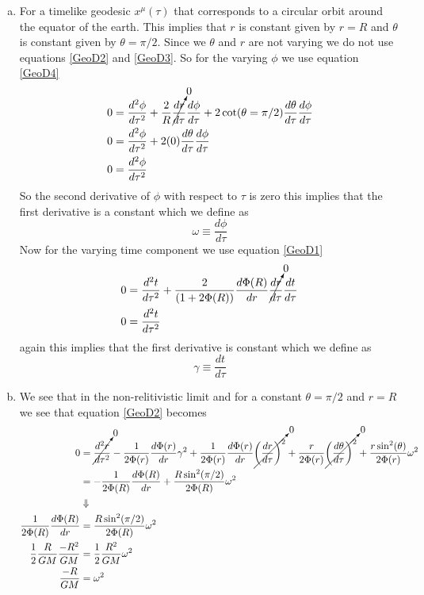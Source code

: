 \documentclass[11pt]{article}
\numberwithin{equation}{section}
\begin{document}
\begin{enumerate}[(a)]
\item
For a timelike geodesic $x^{\mu}(\tau)$ that corresponds to a circular orbit around the equator of the earth. This implies that $r$ is constant given by $r=R$ and $\theta$ is constant given by $\theta=\pi/2$. Since we $\theta$ and $r$ are not varying we do not use equations \ref{GeoD2} and \ref{GeoD3}. So for the varying $\phi$ we use equation \ref{GeoD4}
\begin{align*}
0 &= \frac{d^2\phi}{d\tau^2} + \frac{2}{R}\cancelto{0}{\frac{dr}{d\tau}}\frac{d\phi}{d\tau} + 2\cot(\theta=\pi/2)\frac{d\theta}{d\tau}\frac{d\phi}{d\tau}   \\
0 &= \frac{d^2\phi}{d\tau^2} + 2(0)\frac{d\theta}{d\tau}\frac{d\phi}{d\tau}   \\
0 &= \frac{d^2\phi}{d\tau^2}
\end{align*}
So the second derivative of $\phi$ with respect to $\tau$ is zero this implies that the first derivative is a constant which we define as
$$\omega \equiv \frac{d\phi}{d\tau}$$
Now for the varying time component we use equation \ref{GeoD1}
\begin{align*}
0 &= \frac{d^2t}{d\tau^2} + \frac{2}{(1+2\Phi(R))}\frac{d\Phi(R)}{dr}\cancelto{0}{\frac{dr}{d\tau}}\frac{dt}{d\tau}  \\
0 &= \frac{d^2t}{d\tau^2} 
\end{align*}
again this implies that the first derivative is constant which we define as
$$\gamma\equiv \frac{dt}{d\tau}$$

\item
We see that in the non-relitivistic limit and for a constant $\theta=\pi/2$ and $r=R$ we see that equation \ref{GeoD2} becomes
\begin{align*}
0 &= \cancelto{0}{\frac{d^2r}{d\tau^2}} - \frac{1}{2\Phi(r)}\frac{d\Phi(r)}{dr}\gamma^2 +\frac{1}{2\Phi(r)} \frac{d\Phi(r)}{dr}\cancelto{0}{\left(\frac{dr}{d\tau}\right)^2}  +\frac{r}{2\Phi(r)} \cancelto{0}{\left(\frac{d\theta}{d\tau}\right)^2} + \frac{r\sin^2(\theta)}{2\Phi(r)}\omega^2\\
&= -\frac{1}{2\Phi(R)}\frac{d\Phi(R)}{dr}  + \frac{R\sin^2(\pi/2)}{2\Phi(R)}\omega^2\\
&\Downarrow\\
\frac{1}{2\Phi(R)}\frac{d\Phi(R)}{dr}  &= \frac{R\sin^2(\pi/2)}{2\Phi(R)}\omega^2\\
\frac{1}{2}\frac{R}{GM}\frac{-R^2}{GM}  &= \frac{1}{2}\frac{R^2}{GM}\omega^2\\
\frac{-R}{GM}  &= \omega^2
\end{align*}
\end{enumerate}
\end{document}

